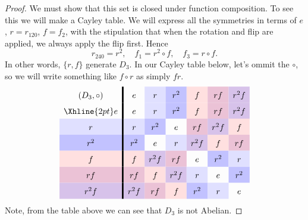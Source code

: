 \documentclass{ximera}
\begin{document}
\begin{example}
\begin{proof}
    We must show that this set is closed under function composition.
    To see this we will make a Cayley table. We will express all the
    symmetries in terms of $e$, $r=r_{120}$, $f=f_2$, with the
    stipulation that when the rotation and flip are applied, we always
    apply the flip first. Hence
    \[
    r_{240} = r^2, \quad  f_1 = r^2\circ f, \quad  f_3 = r\circ f.
    \]
    In other words, $\{r,f\}$ generate $D_3$.  In our Cayley table
    below, let's ommit the $\circ$, so we will write something like
    $f\circ r$ as simply $fr$.
    \[
    \renewcommand{\arraystretch}{1.6}
    \begin{array}{c!{\vline width 2pt}cccccc}
      (D_3,\circ)& e     & r\cellcolor{blue!12!white}     & r^2\cellcolor{blue!24!white}   & f \cellcolor{red!12!white}    & r f \cellcolor{blue!33!red!24!white}  & r^2 f\cellcolor{blue!66!red!24!white} \\  \Xhline{2pt}
      e          & e     & r\cellcolor{blue!12!white}    & r^2\cellcolor{blue!24!white}   & f \cellcolor{red!12!white}    & r f \cellcolor{blue!33!red!24!white}   & r^2f \cellcolor{blue!66!red!24!white} \\  
      r\cellcolor{blue!12!white}         & r\cellcolor{blue!12!white}    & r^2\cellcolor{blue!24!white}   & e     & rf\cellcolor{blue!33!red!24!white} & r^2f \cellcolor{blue!66!red!24!white}    & f \cellcolor{red!12!white}   \\  
      r^2\cellcolor{blue!24!white}        & r^2\cellcolor{blue!24!white}   & e     & r\cellcolor{blue!12!white}    & r^2 f \cellcolor{blue!66!red!24!white}   & f \cellcolor{red!12!white} & rf \cellcolor{blue!33!red!24!white}    \\  
      f \cellcolor{red!12!white}         & f \cellcolor{red!12!white}    & r^2f \cellcolor{blue!66!red!24!white}   & r f \cellcolor{blue!33!red!24!white} & e     & r^2\cellcolor{blue!24!white}    & r\cellcolor{blue!12!white}   \\  
      r f \cellcolor{blue!33!red!24!white}        & rf \cellcolor{blue!33!red!24!white}   & f \cellcolor{red!12!white} & r^2f \cellcolor{blue!66!red!24!white}    & r\cellcolor{blue!12!white}   & e     & r^2\cellcolor{blue!24!white}    \\  
      r^2 f\cellcolor{blue!66!red!24!white}      & r^2 f\cellcolor{blue!66!red!24!white} & rf \cellcolor{blue!33!red!24!white}    & f \cellcolor{red!12!white}   & r^2\cellcolor{blue!24!white}    & r\cellcolor{blue!12!white}   & e     \\  
    \end{array}
    \]
    Note, from the table above we can see that $D_3$ is not Abelian.
  \end{proof}
\end{example}
\end{document}
